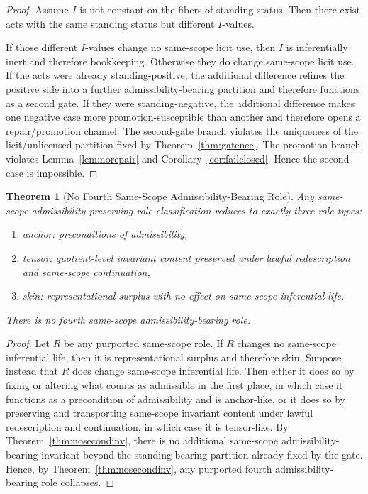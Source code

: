 \documentclass[11pt]{article}
\newtheorem{theorem}{Theorem}[section]
\begin{document}
\begin{proof}
Assume $I$ is not constant on the fibers of standing status. Then there exist acts with the same standing status but different $I$-values.

If those different $I$-values change no same-scope licit use, then $I$ is inferentially inert and therefore bookkeeping. Otherwise they do change same-scope licit use. If the acts were already standing-positive, the additional difference refines the positive side into a further admissibility-bearing partition and therefore functions as a second gate. If they were standing-negative, the additional difference makes one negative case more promotion-susceptible than another and therefore opens a repair/promotion channel. The second-gate branch violates the uniqueness of the licit/unlicensed partition fixed by Theorem~\ref{thm:gatenec}. The promotion branch violates Lemma~\ref{lem:norepair} and Corollary~\ref{cor:failclosed}. Hence the second case is impossible.
\end{proof}

\begin{theorem}[No Fourth Same-Scope Admissibility-Bearing Role]
\label{thm:nofourthrole}
Any same-scope admissibility-preserving role classification reduces to exactly three role-types:
\begin{enumerate}
\item[(i)] \emph{anchor}: preconditions of admissibility,
\item[(ii)] \emph{tensor}: quotient-level invariant content preserved under lawful redescription and same-scope continuation,
\item[(iii)] \emph{skin}: representational surplus with no effect on same-scope inferential life.
\end{enumerate}
There is no fourth same-scope admissibility-bearing role.
\end{theorem}

\begin{proof}
Let $R$ be any purported same-scope role. If $R$ changes no same-scope inferential life, then it is representational surplus and therefore skin. Suppose instead that $R$ does change same-scope inferential life. Then either it does so by fixing or altering what counts as admissible in the first place, in which case it functions as a precondition of admissibility and is anchor-like, or it does so by preserving and transporting same-scope invariant content under lawful redescription and continuation, in which case it is tensor-like. By Theorem~\ref{thm:nosecondinv}, there is no additional same-scope admissibility-bearing invariant beyond the standing-bearing partition already fixed by the gate. Hence, by Theorem~\ref{thm:nosecondinv}, any purported fourth admissibility-bearing role collapses.
\end{proof}
\end{document}
